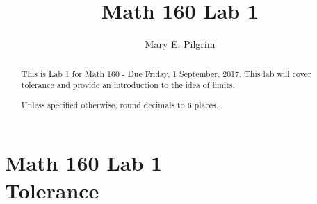 \documentclass[handout,nooutcomes]{ximera}
\title{Math 160 Lab 1}
\author{Mary E. Pilgrim}
\begin{document}
\section{Math 160 Lab 1 \\ Tolerance}

\begin{abstract}
This is Lab 1 for Math 160 - Due Friday, 1 September, 2017. This lab will cover tolerance and provide an introduction to the idea of limits.

Unless specified otherwise, round decimals to 6 places.
\end{abstract}

\maketitle
\end{document}
